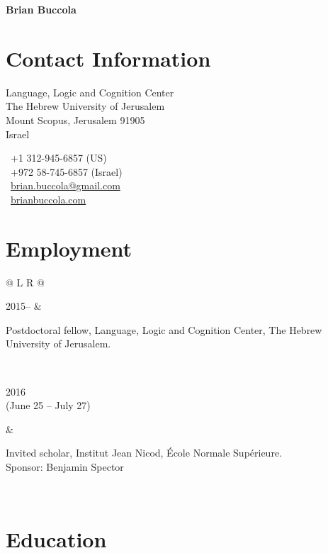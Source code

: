 \documentclass[11pt,letterpaper,twoside]{article}
\makeatletter
\newcommand{\datewidth}{0.20}
\newcommand{\bodywidth}{0.77}
\newenvironment{cvsection}{%
  \setlength{\extrarowheight}{0.70ex}
  \begin{longtable}[l]{@{} L R @{}}
}{%
  \end{longtable}
}
\makeatother
\begin{document}
\thispagestyle{first}

\begin{center}
  {\Huge\bfseries Brian Buccola}
\end{center}

\vspace{1em}

\section*{Contact Information}

\begin{minipage}[t]{0.63\textwidth}
  Language, Logic and Cognition Center\\
  The Hebrew University of Jerusalem\\
  Mount Scopus, Jerusalem 91905\\
  Israel
\end{minipage}
\begin{minipage}[t]{0.36\textwidth}
  \Telefon\ +1 312-945-6857 {\footnotesize (US)}\\
  \Telefon\ +972 58-745-6857 {\footnotesize (Israel)}\\
  \Letter\ \href{mailto:brian.buccola@gmail.com}{\ttfamily brian.buccola@gmail.com}\\
  \Keyboard\ \href{http://brianbuccola.com/}{\ttfamily brianbuccola.com}
\end{minipage}

\section*{Employment}

\begin{cvsection}
  2015-- & \parbox[t]{\bodywidth\textwidth}{%
    Postdoctoral fellow, Language, Logic and Cognition Center, The Hebrew
    University of Jerusalem.
  }\\

  \parbox[t]{\datewidth\textwidth}{%
    2016\\
    {\footnotesize (June 25 -- July 27)}
  } & \parbox[t]{\bodywidth\textwidth}{%
    Invited scholar, Institut Jean Nicod, École Normale Supérieure.\\
    {\footnotesize Sponsor: Benjamin Spector}
  }\\
\end{cvsection}

\section*{Education}
\end{document}
